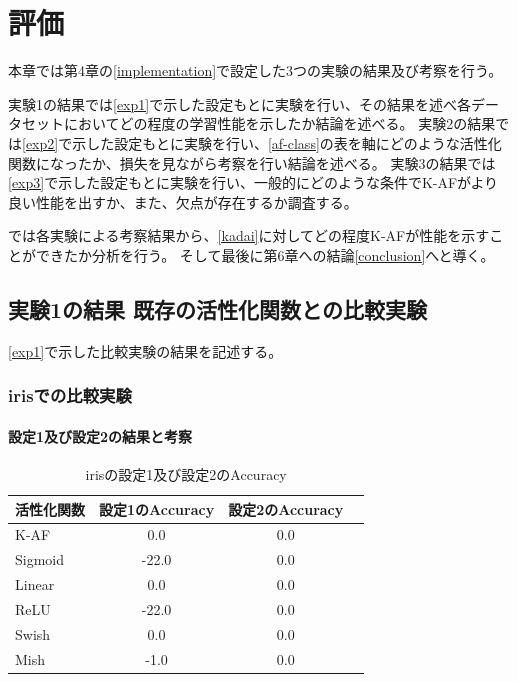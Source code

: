 \chapter{評価}
\label{evaluation}

本章では第4章の\ref{implementation}で設定した3つの実験の結果及び考察を行う。

実験1の結果\label{evo1}では\ref{exp1}で示した設定もとに実験を行い、その結果を述べ各データセットにおいてどの程度の学習性能を示したか結論を述べる。
実験2の結果\label{evo2}では\ref{exp2}で示した設定もとに実験を行い、\ref{af-class}の表を軸にどのような活性化関数になったか、損失を見ながら考察を行い結論を述べる。
実験3の結果\label{evo3}では\ref{exp3}で示した設定もとに実験を行い、一般的にどのような条件でK-AFがより良い性能を出すか、また、欠点が存在するか調査する。

\label{result}では各実験による考察結果から、\ref{kadai}に対してどの程度K-AFが性能を示すことができたか分析を行う。
そして最後に第6章への結論\ref{conclusion}へと導く。


\section{実験1の結果 既存の活性化関数との比較実験}
\label{evo1}
\ref{exp1}で示した比較実験の結果を記述する。

\subsection{irisでの比較実験}
\label{ev:iris}

\subsubsection{設定1及び設定2の結果と考察}


\begin{table}[htbp]
    \begin{center}
        \caption{irisの設定1及び設定2のAccuracy}
        \vspace{2mm} 
        \begin{tabular}{l*{2}{c}r}
            活性化関数  & 設定1のAccuracy &  設定2のAccuracy \\
            \hline
            K-AF            & 0.0 & 0.0 \\
            Sigmoid            & -22.0 & 0.0\\
            Linear            & 0.0 & 0.0\\
            ReLU        & -22.0 & 0.0\\
            Swish           & 0.0 & 0.0 \\
            Mish           & -1.0 & 0.0\\
    
        \end{tabular}
    \end{center}
\end{table}



